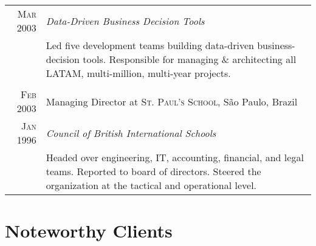 \documentclass[a4paper,10pt]{article}
\begin{document}
\begin{tabular}{r|p{14cm}}
  \textsc{Mar 2003} & \emph{Data-Driven Business Decision Tools} \\

  &\footnotesize{Led five development teams building data-driven
    business-decision tools. Responsible for managing \& architecting
    all LATAM, multi-million, multi-year projects.}\\

  \multicolumn{2}{c}{}\\

  \textsc{Feb 2003} & Managing Director at \textsc{St. Paul's School}, S\~{a}o
  Paulo, Brazil \\

  \textsc{Jan 1996} & \emph{Council of British International Schools} \\

  &\footnotesize{Headed over engineering, IT, accounting, financial, and legal
    teams. Reported to board of directors. Steered the organization at the
    tactical and operational level.}\\

\end{tabular}

\section{Noteworthy Clients}
\end{document}
